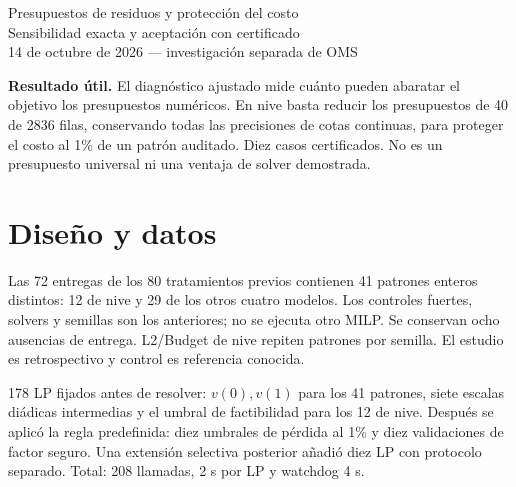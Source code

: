\documentclass[10pt,a4paper]{article}
\begin{document}
\begin{center}{\Large Presupuestos de residuos y protección del costo}\\[4pt]
{\large Sensibilidad exacta y aceptación con certificado}\\[3pt]
14 de octubre de 2026 --- investigación separada de OMS\end{center}
\textbf{Resultado útil.} El diagnóstico ajustado mide cuánto pueden abaratar
el objetivo los presupuestos numéricos. En nive basta reducir los presupuestos
de 40 de 2836 filas, conservando todas las precisiones de cotas continuas,
para proteger el costo al 1\% de un patrón auditado. Diez casos certificados.
No es un presupuesto universal ni una ventaja de solver demostrada.
\section*{Diseño y datos}
Las 72 entregas de los 80 tratamientos previos contienen 41 patrones enteros
distintos: 12 de nive y 29 de los otros cuatro modelos. Los controles fuertes,
solvers y semillas son los anteriores; no se ejecuta otro MILP. Se conservan
ocho ausencias de entrega. L2/Budget de nive repiten patrones por semilla.
El estudio es retrospectivo y control es referencia conocida.

178 LP fijados antes de resolver: $v(0),v(1)$ para los 41 patrones, siete
escalas diádicas intermedias y el umbral de factibilidad para los 12 de nive.
Después se aplicó la regla predefinida: diez umbrales de pérdida al 1\% y diez
validaciones de factor seguro. Una extensión selectiva posterior añadió diez
LP con protocolo separado. Total: 208 llamadas, 2 s por LP y watchdog 4 s.
\end{document}
